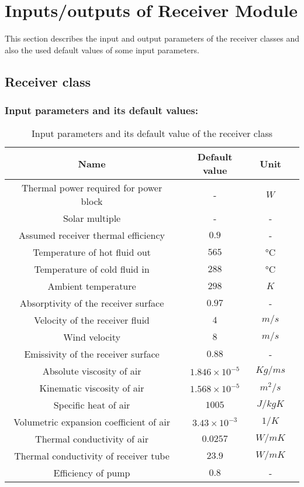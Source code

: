\section{Inputs/outputs of Receiver Module}
This section describes the input and output parameters of the receiver classes and also the used default values of some input parameters. 
\subsection{Receiver class}
\subsubsection{Input parameters and its default values:}
\begin{table}[h!]
	\begin{center}
		\begin{tabular}{ |c|c|c|c| } 
			\hline
			\textbf{Name} & \textbf{Default value} & \textbf{Unit} \\
			\hline
			Thermal power required for power block & - & $W$\\
			\hline
			 Solar multiple & - & - \\ 
			\hline
			Assumed receiver thermal efficiency & $0.9$	& - \\ 
			\hline
			Temperature of hot fluid out & $565$ & °C \\
			\hline
			Temperature of cold fluid in & $288$ & °C \\
			\hline
			Ambient temperature & $298$ & $ K $ \\
			\hline
			Absorptivity of the receiver surface & $0.97 $ & - \\
			\hline
			Velocity of the receiver fluid & $4$ &  $ m/s $ \\
			\hline
			Wind velocity & $8$ &  $m/s$ \\
			\hline
			Emissivity of the receiver surface & $0.88$ & - \\
			\hline
			Absolute viscosity of air  & $1.846 \times 10^{-5}$ & $Kg/m s$ \\
			\hline
			Kinematic viscosity of air  & $1.568 \times 10^{-5}$ & $ m^2/s $ \\
			\hline
			Specific heat of air  & $1005$ & $J/kg K$ \\
			\hline
			Volumetric expansion coefficient of air  & $3.43 \times 10^{-3}$ & $1 / K$ \\
			\hline
			Thermal conductivity of air  & $0.0257$ & $W/m K$ \\
			\hline
			Thermal conductivity of receiver tube & $23.9 $ & $W/m K$ \\
			\hline
			Efficiency of pump & $0.8$ & - \\
			\hline
		\end{tabular}
		\caption{Input parameters and its default value of the receiver class}
		\label{Receiver class input parameters}
	\end{center}
\end{table}
